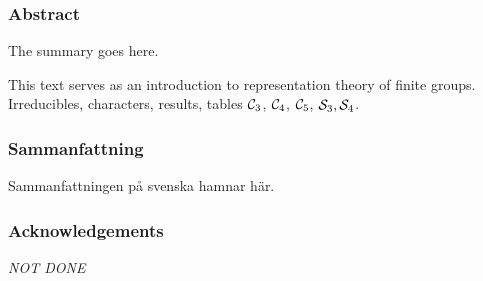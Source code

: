 \clearpage{\thispagestyle{empty}}
\begin{center}
	\subsubsection*{Abstract}
\end{center}
	
	The summary goes here. %
	
	This text serves as an introduction to representation theory of finite groups. Irreducibles, characters, results, tables $\mathcal{C}_3$, $\mathcal{C}_4$, $\mathcal{C}_5$, $\mathcal{S}_3, \mathcal{S}_4$.
	
\begin{center}
	\item\subsubsection*{Sammanfattning}
\end{center}
	
	Sammanfattningen på svenska hamnar här. %

\begin{center}
	\item\subsubsection*{Acknowledgements}
\end{center}
	
	\textit{NOT DONE}
	
	


